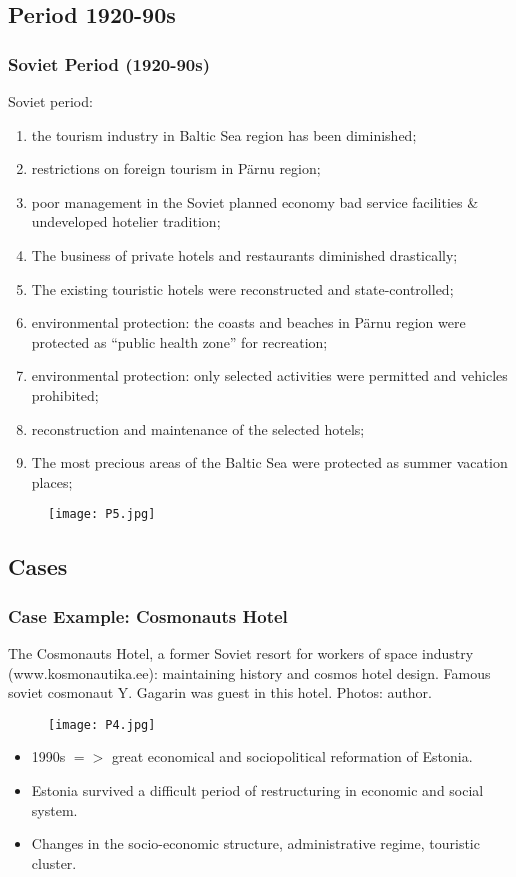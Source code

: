 \documentclass[pdflatex,compress,8pt,
	xcolor={dvipsnames,dvipsnames,svgnames,x11names,table},
	hyperref={	
	breaklinks = true, 
	pdfauthor={Lemenkova Polina}, 
	pdfsubject={Preentation}, 
	pdfcreator={Lemenkova Polina}, 
	pdfproducer={Lemenkova Polina}, 
	colorlinks=true,
	linkcolor=Tomato, 
	citecolor=DeepPink3, 
	urlcolor = NavyBlue, 
	breaklinks = true}]{beamer}
\begin{document}
\subsection{Period 1920-90s}
\begin{frame}\frametitle{Soviet Period (1920-90s)}
\vspace{3em}
Soviet period:
\begin{enumerate}
	\item the tourism industry in Baltic Sea region has been diminished;
	\item restrictions on foreign tourism in Pärnu region;
	\item poor management in the Soviet planned economy bad service facilities \& undeveloped hotelier tradition;
	\item The business of private hotels and restaurants diminished drastically;
	\item The existing touristic hotels were reconstructed and state-controlled;
	\item environmental protection: the coasts and beaches in Pärnu region were protected as “public health zone” for recreation;
	\item environmental protection: only selected activities were permitted and vehicles prohibited;
	\item reconstruction and maintenance of the selected hotels;
	\item The most precious areas of the Baltic Sea were protected as summer vacation places;
\end{enumerate}
\begin{figure}[H]
	\centering
		\texttt{[image: P5.jpg]}
\end{figure}
\end{frame} 

\subsection{Cases}
\begin{frame}\frametitle{Case Example: Cosmonauts Hotel}
\vspace{3em}
\small{The Cosmonauts Hotel, a former Soviet resort for workers of space industry (www.kosmonautika.ee): maintaining history and cosmos hotel design. Famous soviet cosmonaut Y. Gagarin was guest in this hotel. Photos: author.}
\begin{figure}[H]
	\centering
		\texttt{[image: P4.jpg]}
\end{figure}
\begin{itemize}
	\item 1990s $=>$ great economical and sociopolitical reformation of Estonia.
	\item Estonia survived a difficult period of restructuring in economic and social system.
	\item Changes in the socio-economic structure, administrative regime, touristic cluster.
\end{itemize}
\end{frame} 
\end{document}
